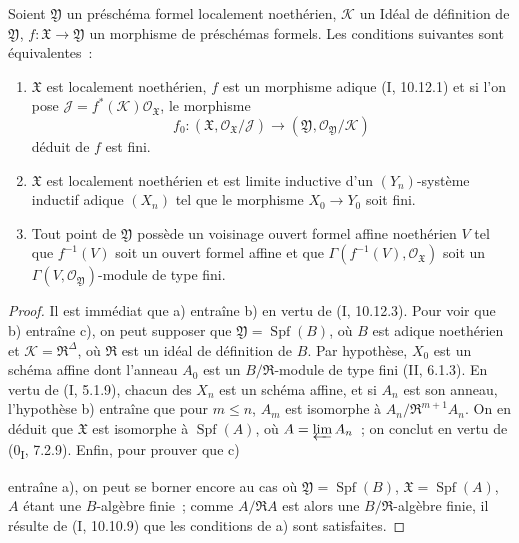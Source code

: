 \begin{proposition}[4.8.1]
\label{III.4.8.1-fr}
Soient $\mathfrak Y$ un préschéma formel localement noethérien, $\mathcal K$ un
Idéal de définition de $\mathfrak Y$, $f:\mathfrak X\to\mathfrak Y$ un
morphisme de préschémas formels. Les conditions suivantes sont équivalentes~:
\begin{enumerate}
\item[a)] $\mathfrak X$ est localement noethérien, $f$ est un morphisme adique
  (I, 10.12.1) et si l'on pose
  $\mathcal J=f^*(\mathcal K)\mathcal O_{\mathfrak X}$, le morphisme
  \[
  f_0:(\mathfrak X,\mathcal O_{\mathfrak X}/\mathcal J)
  \longrightarrow
  (\mathfrak Y,\mathcal O_{\mathfrak Y}/\mathcal K)
  \]
  déduit de $f$ est fini.
\item[b)] $\mathfrak X$ est localement noethérien et est limite inductive d'un
  $(Y_n)$-système inductif adique $(X_n)$ tel que le morphisme
  $X_0\to Y_0$ soit fini.
\item[c)] Tout point de $\mathfrak Y$ possède un voisinage ouvert formel affine
  noethérien $V$ tel que $f^{-1}(V)$ soit un ouvert formel affine et que
  $\Gamma(f^{-1}(V),\mathcal O_{\mathfrak X})$ soit un
  $\Gamma(V,\mathcal O_{\mathfrak Y})$-module de type fini.
\end{enumerate}
\end{proposition}

\begin{proof}
Il est immédiat que a) entraîne b) en vertu de (I, 10.12.3). Pour voir que b)
entraîne c), on peut supposer que
$\mathfrak Y=\operatorname{Spf}(B)$, où $B$ est adique noethérien et
$\mathcal K=\mathfrak R^\Delta$, où $\mathfrak R$ est un idéal de définition
de $B$. Par hypothèse, $X_0$ est un schéma affine dont l'anneau $A_0$ est un
$B/\mathfrak R$-module de type fini (II, 6.1.3). En vertu de (I, 5.1.9), chacun
des $X_n$ est un schéma affine, et si $A_n$ est son anneau, l'hypothèse b)
entraîne que pour $m\leq n$, $A_m$ est isomorphe à
$A_n/\mathfrak R^{m+1}A_n$. On en déduit que $\mathfrak X$ est isomorphe à
$\operatorname{Spf}(A)$, où $A=\varprojlim A_n$~; on conclut en vertu de
(0\textsubscript{I}, 7.2.9). Enfin, pour prouver que c)


entraîne a), on peut se borner encore au cas où
$\mathfrak Y=\operatorname{Spf}(B)$, $\mathfrak X=\operatorname{Spf}(A)$,
$A$ étant une $B$-algèbre finie~; comme $A/\mathfrak RA$ est alors une
$B/\mathfrak R$-algèbre finie, il résulte de (I, 10.10.9) que les conditions
de a) sont satisfaites.
\end{proof}

